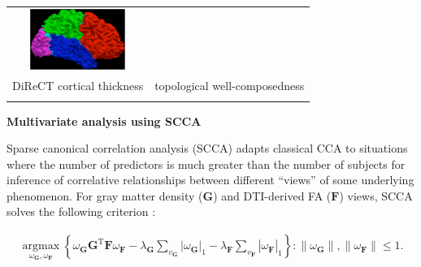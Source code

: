\documentclass[paperwidth=48in,paperheight=48in,portrait,final]{baposter}
\begin{document}
\begin{poster}
{\begin{center}
\begin{tabular}{cc}
\includegraphics[height=20mm]{glamglue.pdf} \\
DiReCT cortical thickness \cite{Das2009} & topological well-composedness \cite{Tustison2011} \\
\vspace{-1mm}\\
\end{tabular}
\end{center}

\vspace{-6mm}

\begin{center}
{\bf Multivariate analysis using SCCA}\\
\end{center}
\vspace{-1mm}
Sparse canonical correlation analysis (SCCA) adapts classical CCA to
situations where the number of predictors is much greater than the number
of subjects for inference of correlative relationships between different
``views'' of some underlying phenomenon. For gray matter density ($\mathbf{G}$) and
DTI-derived FA  ($\mathbf{F}$) views, SCCA solves the following
criterion \cite{Avants2010b}:
\vspace{-7mm}
\begin{center}
\begin{align*}
\underset{\omega_{\mathbf{G}}, \omega_{\mathbf{F}}}{\operatorname{argmax}} \left\{\omega_{\mathbf{G}} \mathbf{G}^\mathrm{T}\mathbf{F}\omega_{\mathbf{F}} - \lambda_{\mathbf{G}}\sum_{v_{\mathbf{G}}} |\omega_{\mathbf{G}}|_1 - \lambda_{\mathbf{F}}\sum_{v_{\mathbf{F}}} |\omega_{\mathbf{F}}|_1\right\}: \|\omega_{\mathbf{G}}\|, \|\omega_{\mathbf{F}}\| \leq 1.
\end{align*}
\end{center}


  }


\end{poster}
\end{document}
